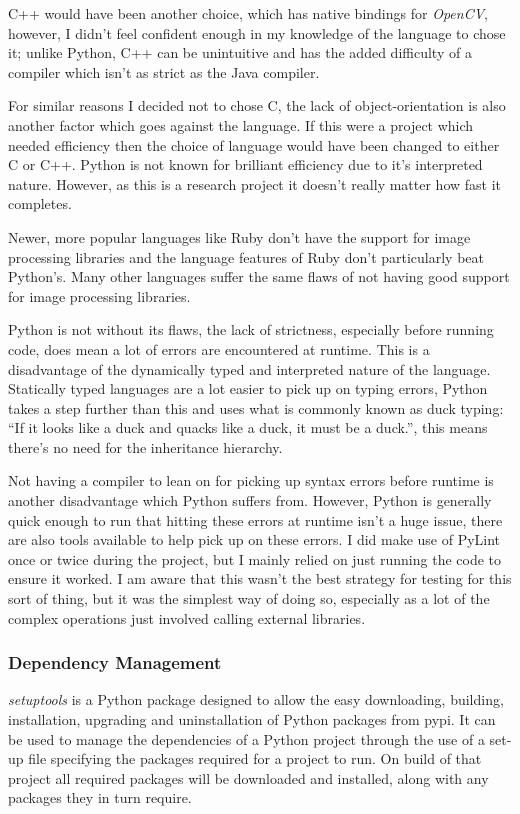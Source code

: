 C++ would have been another choice, which has native bindings for \emph{OpenCV}, however, I didn't
feel confident enough in my knowledge of the language to chose it; unlike Python, C++ can be 
unintuitive and has the added difficulty of a compiler which isn't as strict as the Java compiler.

For similar reasons I decided not to chose C, the lack of object-orientation is also another 
factor which goes against the language. If this were a project which needed efficiency then the
choice of language would have been changed to either C or C++. Python is not known for brilliant
efficiency due to it's interpreted nature. However, as this is a research project it doesn't 
really matter how fast it completes.

Newer, more popular languages like Ruby don't have the support for image processing libraries and
the language features of Ruby don't particularly beat Python's. Many other languages suffer the
same flaws of not having good support for image processing libraries.

Python is not without its flaws, the lack of strictness, especially before running code, does mean
a lot of errors are encountered at runtime. This is a disadvantage of the dynamically typed and
interpreted nature of the language. Statically typed languages are a lot easier to pick up on
typing errors, Python takes a step further than this and uses what is commonly known as duck
typing: ``If it looks like a duck and quacks like a duck, it must be a duck.''\cite{2013Glossary},
this means there's no need for the inheritance hierarchy. 

Not having a compiler to lean on for picking up syntax errors before runtime is another
disadvantage which Python suffers from. However, Python is generally quick enough to run that 
hitting these errors at runtime isn't a huge issue, there are also tools available to help pick up
on these errors. I did make use of PyLint once or twice during the project, but I mainly relied on
just running the code to ensure it worked. I am aware that this wasn't the best strategy for 
testing for this sort of thing, but it was the simplest way of doing so, especially as a lot of
the complex operations just involved calling external libraries.


\subsubsection{Dependency Management}
\emph{setuptools} is a Python package designed to allow the easy downloading, building, 
installation, upgrading and uninstallation of Python packages from \gls{pypi}. It can be used to
manage the dependencies of a Python project through the use of a set-up file specifying the 
packages required for a project to run. On build of that project all required packages will be 
downloaded and installed, along with any packages they in turn require.

